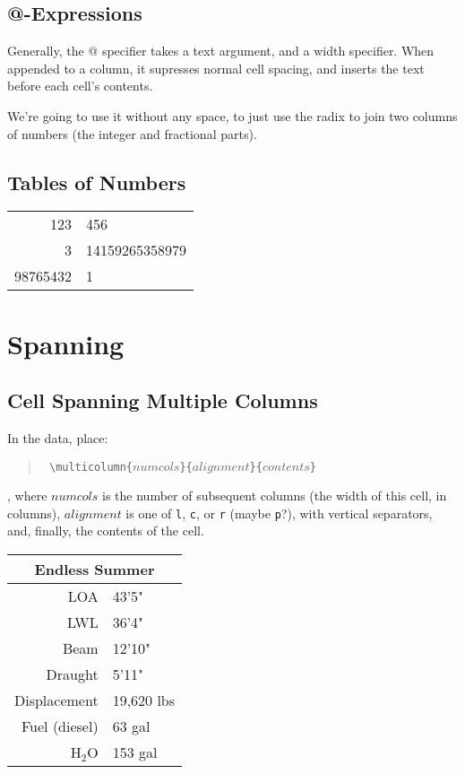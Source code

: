 \subsection{@-Expressions}
\label{atexpr}

Generally, the @ specifier takes a text argument, and a width specifier.
When appended to a column, it supresses normal cell spacing, and inserts the
text before each cell's contents.

We're going to use it without any space, to just use the radix to join two
columns of numbers (the integer and fractional parts).

\subsection{Tables of Numbers}

\begin{center}
	\begin{tabular}{ r @{.} l }
		123 & 456 \\
		3&14159265358979\\
		98765432 & 1 \\
	\end{tabular}
\end{center}


\section{Spanning}
\label{tablespan}

\subsection{Cell Spanning Multiple Columns}

In the data, place:

\begin{quote}
	\texttt{ \textbackslash{}multicolumn\{$numcols$\}\{$alignment$\}\{$contents$\} }
\end{quote}

, where $numcols$ is the number of subsequent columns (the width of this
cell, in columns), $alignment$ is one of \texttt{l}, \texttt{c}, or
\texttt{r} (maybe \texttt{p}?), with vertical separators, and, finally, the
contents of the cell.

\begin{center}
	\begin{tabular}{|r|l|}
		\hline
		\multicolumn{2}{|c|}{Endless Summer} \\
		\hline
		LOA & 43'5" \\
		\hline
		LWL & 36'4" \\
		\hline
		Beam & 12'10" \\
		\hline
		Draught & 5'11" \\
		\hline
		Displacement & 19,620 lbs \\
		\hline
		Fuel (diesel) & 63 gal \\
		\hline
		H$_2$O & 153 gal \\
		\hline
	\end{tabular}
\end{center}


